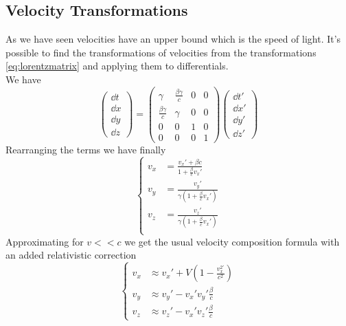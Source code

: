 \documentclass[../admech.tex]{subfiles}
\begin{document}
\subsection{Velocity Transformations}
As we have seen velocities have an upper bound which is the speed of light. It's possible to find the transformations of velocities from the transformations \eqref{eq:lorentzmatrix} and applying them to differentials.\\
We have
\begin{equation}
	\begin{pmatrix}\dd t\\\dd x\\ \dd y\\ \dd z\end{pmatrix}=\begin{pmatrix}\gamma&\frac{\beta\gamma}{c}&0&0\\\frac{\beta\gamma}{c}&\gamma&0&0\\0&0&1&0\\0&0&0&1\end{pmatrix}\begin{pmatrix}\dd t'\\\dd x'\\\dd y'\\\dd z'\end{pmatrix}
	\label{eq:difftranslor}
\end{equation}
Rearranging the terms we have finally
\begin{equation}
	\left\{\begin{aligned}
		v_x&=\frac{v_x'+\beta c}{1+\frac{\beta}{c}v_x'}\\
		v_y&=\frac{v_y'}{\gamma\left( 1+\frac{\beta}{c}v_x' \right)}\\
		v_z&=\frac{v_z'}{\gamma\left( 1+\frac{\beta}{c}v_x' \right)}\\
	\end{aligned}\right.
	\label{eq:veltrans}
\end{equation}
Approximating for $v<<c$ we get the usual velocity composition formula with an added relativistic correction
\begin{equation}
	\left\{\begin{aligned}
			v_x&\approx v_x'+V\left( 1-\frac{v^{2'}_x}{c^2} \right)\\
			v_y&\approx v_y'-v_x'v_y'\frac{\beta}{c}\\
			v_z&\approx v_z'-v_x'v_z'\frac{\beta}{c}
	\end{aligned}\right.
	\label{eq:velapprox}
\end{equation}
\end{document}
